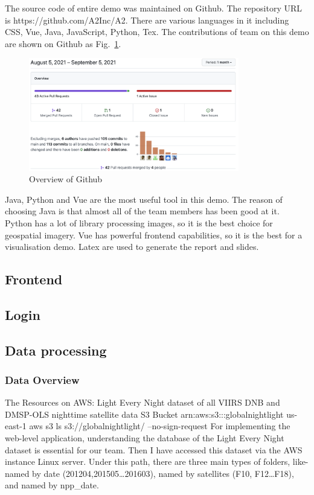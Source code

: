 \documentclass[conference]{IEEEtran}
\begin{document}
The source code of entire demo was maintained on Github. The repository URL is https://github.com/A2Inc/A2. There are various languages in it including 
CSS, Vue, Java, JavaScript, Python, Tex. The contributions of team on this demo are shown on Github as Fig.~\ref{fig3}.

\begin{figure}[htbp]
    \centerline{\includegraphics[width=260pt]{images/github.png}}
    \caption{Overview of Github}
    \label{fig3}
\end{figure}

Java, Python and Vue are the most useful tool in this demo. The reason of choosing Java is that almost all of the team members has been good at it. Python 
has a lot of library processing images, so it is the best choice for geospatial imagery. Vue has powerful frontend capabilities, so it is the best for a 
visualisation demo. Latex are used to generate the report and slides.

\subsection{Frontend}

\subsection{Login}
 
\subsection{Data processing}
\subsubsection{Data Overview}
    The Resources on AWS: 
	Light Every Night dataset of all VIIRS DNB and DMSP-OLS nighttime satellite data
	S3 Bucket
	arn:aws:s3:::globalnightlight
	us-east-1
	aws s3 ls s3://globalnightlight/ --no-sign-request
	For implementing the web-level application, understanding the database of the Light Every Night dataset is essential for our team. Then I have accessed this dataset via the AWS instance Linux server. 
	Under this path, there are three main types of folders, like-named by date (201204,201505…201603), named by satellites (F10, F12…F18), and named by npp_date.
\end{document}
